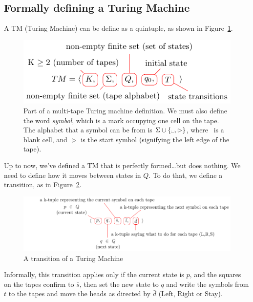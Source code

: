 \subsection{Formally defining a Turing Machine}

A TM (Turing Machine) can be define as a quintuple, as shown in
Figure~\ref{fig:tm-definition}.

\begin{figure}[H]
  \centering
  \includegraphics{equations/tm-definition}
  \caption{Part of a multi-tape Turing machine definition. We must also define
  the word \textit{symbol}, which is a mark occupying one cell on the tape. The
  alphabet that a symbol can be from is $\Sigma \cup \{
  \textrm{\textvisiblespace}, \vartriangleright\}$, where \textvisiblespace~is a
  blank cell, and $\vartriangleright$ is the start symbol (signifying the left
  edge of the tape).}
  \label{fig:tm-definition}
\end{figure}

Up to now, we've defined a TM that is perfectly formed\dots but does nothing. We
need to define how it moves between states in $Q$. To do that, we define a
transition, as in Figure~\ref{fig:tm-transition}.

\begin{figure}[H]
  \centering
  \includegraphics{equations/tm-transition}
  \caption{A transition of a Turing Machine}
  \label{fig:tm-transition}
\end{figure}

Informally, this transition applies only if the current state is $p$, and the
squares on the tapes confirm to $\bar{s}$, then set the new state to $q$ and
write the symbols from $\bar{t}$ to the tapes and move the heads as directed by
$\bar{d}$ (Left, Right or Stay).

